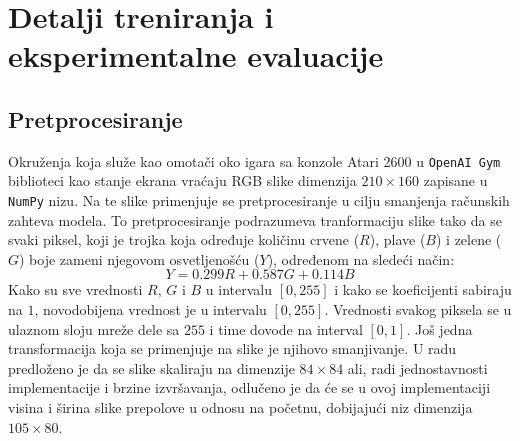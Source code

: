 \chapter{Detalji treniranja i eksperimentalne evaluacije}
\label{ch:treniranje_testiranje}

\section{Pretprocesiranje}
\label{sec:pretprocesiranje}
Okruženja koja služe kao omotači oko igara sa konzole Atari 2600 u \texttt{OpenAI Gym} biblioteci kao stanje ekrana vraćaju RGB slike dimenzija $210 \times 160$ zapisane u \texttt{NumPy} nizu. Na te slike primenjuje se pretprocesiranje u cilju smanjenja računskih zahteva modela. To pretprocesiranje podrazumeva tranformaciju slike tako da se svaki piksel, koji je trojka koja određuje količinu crvene ($R$), plave ($B$) i zelene ($G$) boje zameni njegovom osvetljenošću ($Y$), određenom na sledeći način:
\begin{equation}
\label{eq:lum}
	Y = 0.299 R + 0.587 G + 0.114 B
\end{equation}
Kako su sve vrednosti $R$, $G$ i $B$ u intervalu $[0, 255]$ i kako se koeficijenti sabiraju na $1$, novodobijena vrednost je u intervalu $[0, 255]$. Vrednosti svakog piksela se u ulaznom sloju mreže dele sa $255$ i time dovode na interval $[0, 1]$. Još jedna transformacija koja se primenjuje na slike je njihovo smanjivanje. U radu \cite{dqn_dm} predloženo je da se slike skaliraju na dimenzije $84 \times 84$ ali, radi jednostavnosti implementacije i brzine izvršavanja, odlučeno je da će se u ovoj implementaciji visina i širina slike prepolove u odnosu na početnu, dobijajući niz dimenzija $105 \times 80$.

